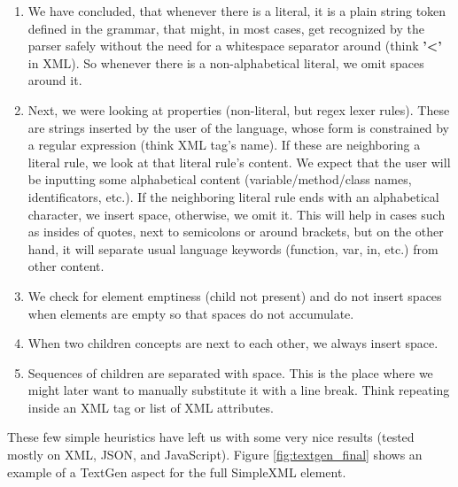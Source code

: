 \begin{enumerate}
	\item We have concluded, that whenever there is a literal, it is a plain string token defined in the grammar, that might, in most cases, get recognized by the parser safely without the need for a whitespace separator around (think \textbf{'\textless'} in XML).
	So whenever there is a non-alphabetical literal, we omit spaces around it.

	\item Next, we were looking at properties (non-literal, but regex lexer rules).
	These are strings inserted by the user of the language, whose form is constrained by a regular expression (think XML tag's name).
	If these are neighboring a literal rule, we look at that literal rule's content.
	We expect that the user will be inputting some alphabetical content (variable/method/class names, identificators, etc.).
	If the neighboring literal rule ends with an alphabetical character, we insert space, otherwise, we omit it.
	This will help in cases such as insides of quotes, next to semicolons or around brackets, but on the other hand, it will separate usual language keywords (function, var, in, etc.) from other content.

	\item We check for element emptiness (child not present) and do not insert spaces when elements are empty so that spaces do not accumulate.

	\item When two children concepts are next to each other, we always insert space.

	\item Sequences of children are separated with space.
	This is the place where we might later want to manually substitute it with a line break.
	Think repeating  inside an XML tag or list of XML attributes.
\end{enumerate}

These few simple heuristics have left us with some very nice results (tested mostly on XML, JSON, and JavaScript). Figure \ref{fig:textgen_final} shows an example of a TextGen aspect for the full SimpleXML element.
\\

